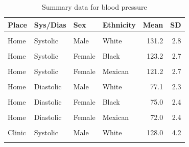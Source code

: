 \documentclass[
]{article}
\begin{document}
\begin{table}[!h]
\centering
\caption{\label{tab:summaries}Summary data for blood pressure}
\centering
\begin{tabular}[t]{llllrr}
\toprule
Place & Sys/Dias & Sex & Ethnicity & Mean & SD\\
\midrule
\cellcolor{gray!10}{Home} & \cellcolor{gray!10}{Systolic} & \cellcolor{gray!10}{Male} & \cellcolor{gray!10}{Black} & \cellcolor{gray!10}{128.8} & \cellcolor{gray!10}{2.7}\\
Home & Systolic & Male & White & 131.2 & 2.8\\
\cellcolor{gray!10}{Home} & \cellcolor{gray!10}{Systolic} & \cellcolor{gray!10}{Male} & \cellcolor{gray!10}{Mexican} & \cellcolor{gray!10}{127.1} & \cellcolor{gray!10}{2.5}\\
Home & Systolic & Female & Black & 123.2 & 2.7\\
\cellcolor{gray!10}{Home} & \cellcolor{gray!10}{Systolic} & \cellcolor{gray!10}{Female} & \cellcolor{gray!10}{White} & \cellcolor{gray!10}{127.2} & \cellcolor{gray!10}{2.9}\\
Home & Systolic & Female & Mexican & 121.2 & 2.7\\
\addlinespace
\cellcolor{gray!10}{Home} & \cellcolor{gray!10}{Diastolic} & \cellcolor{gray!10}{Male} & \cellcolor{gray!10}{Black} & \cellcolor{gray!10}{78.7} & \cellcolor{gray!10}{2.4}\\
Home & Diastolic & Male & White & 77.1 & 2.3\\
\cellcolor{gray!10}{Home} & \cellcolor{gray!10}{Diastolic} & \cellcolor{gray!10}{Male} & \cellcolor{gray!10}{Mexican} & \cellcolor{gray!10}{76.8} & \cellcolor{gray!10}{2.4}\\
Home & Diastolic & Female & Black & 75.0 & 2.4\\
\cellcolor{gray!10}{Home} & \cellcolor{gray!10}{Diastolic} & \cellcolor{gray!10}{Female} & \cellcolor{gray!10}{White} & \cellcolor{gray!10}{73.7} & \cellcolor{gray!10}{2.3}\\
Home & Diastolic & Female & Mexican & 72.0 & 2.4\\
\addlinespace
\cellcolor{gray!10}{Clinic} & \cellcolor{gray!10}{Systolic} & \cellcolor{gray!10}{Male} & \cellcolor{gray!10}{Black} & \cellcolor{gray!10}{127.7} & \cellcolor{gray!10}{3.5}\\
Clinic & Systolic & Male & White & 128.0 & 4.2\\
\cellcolor{gray!10}{Clinic} & \cellcolor{gray!10}{Systolic} & \cellcolor{gray!10}{Male} & \cellcolor{gray!10}{Mexican} & \cellcolor{gray!10}{123.5} & \cellcolor{gray!10}{3.5}\\

\end{tabular}
\end{table}
\end{document}
